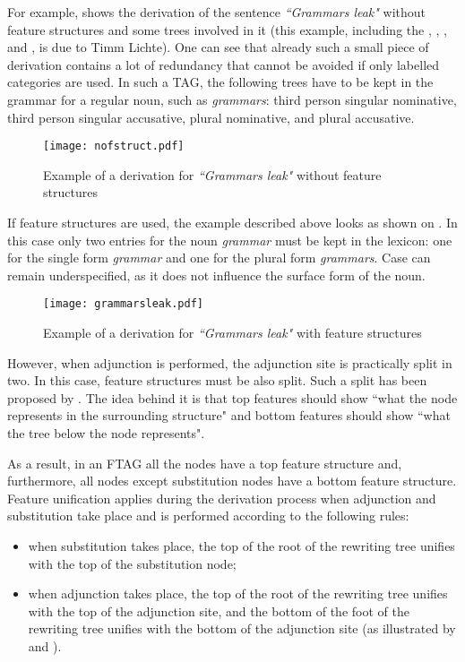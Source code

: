 For example,  shows the derivation of the sentence \textit{``Grammars leak"} without feature structures and some trees involved in it (this example, including the ,  ,  , and  , is due to Timm Lichte). One can see that already such a small piece of derivation contains a lot of redundancy that cannot be avoided if only labelled categories are used. In such a TAG, the following trees have to be kept in the grammar for a regular noun, such as \textit{grammars}: third person singular nominative, third person singular accusative, plural nominative, and plural accusative.
\begin{figure}[h!]
	\centering
    \texttt{[image: nofstruct.pdf]}
    \caption{Example of a derivation for \textit{``Grammars leak"} without feature structures  \label{fig:nofstruct}}
\end{figure}

If feature structures are used, the example described above looks as shown on . In this case only two entries for the noun \textit{grammar} must be kept in the lexicon: one for the single form \textit{grammar} and one for the plural form \textit{grammars}. Case can remain underspecified, as it does not influence the surface form of the noun.

\begin{figure}[h!]
	\centering
    \texttt{[image: grammarsleak.pdf]}
    \caption{Example of a derivation for \textit{``Grammars leak"} with feature structures \label{fig:grleaksubst}}
\end{figure}

However, when adjunction is performed, the adjunction site is practically split in two. In this case, feature structures must be also split. Such a split has been proposed by \citet{Vijay-ShankerJoshi:88}. The idea behind it is that top features should show ``what the node represents in the surrounding structure" and bottom features should show ``what the tree below the node represents".

As a result, in an FTAG all the nodes have a top feature structure and, furthermore, all nodes except substitution nodes have a bottom feature structure. Feature unification applies during the derivation process when adjunction and substitution take place and is performed according to the following rules:
\begin{itemize}
\item when substitution takes place, the top of the root of the rewriting tree unifies with the top of the substitution node;
\item when adjunction takes place, the top of the root of the rewriting tree unifies with the top of the adjunction site, and the bottom of the foot of the rewriting tree unifies with the bottom of the adjunction site (as illustrated by  and ).
\end{itemize}

